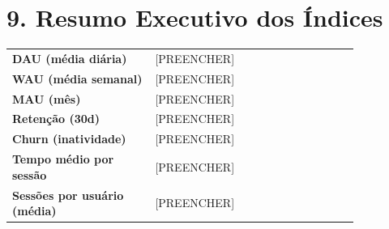 \documentclass[12pt]{article}
\providecommand{\DAUmedio}{[PREENCHER]}
\providecommand{\WAUMedio}{[PREENCHER]}
\providecommand{\MAU}{[PREENCHER]}
\providecommand{\RetencaoTaxa}{[PREENCHER]}
\providecommand{\ChurnTaxa}{[PREENCHER]}
\providecommand{\TempoMedioHM}{[PREENCHER]}
\providecommand{\SessoesPorUsuario}{[PREENCHER]}
\begin{document}
\section*{9. Resumo Executivo dos Índices}
\begin{center}
\begin{tabular}{>{\bfseries}p{0.35\linewidth} p{0.5\linewidth}}
\toprule
DAU (média diária) & \DAUmedio \\
WAU (média semanal) & \WAUMedio \\
MAU (mês) & \MAU \\
Retenção (30d) & \RetencaoTaxa \\
Churn (inatividade) & \ChurnTaxa \\
Tempo médio por sessão & \TempoMedioHM \\
Sessões por usuário (média) & \SessoesPorUsuario \\
\bottomrule
\end{tabular}
\end{center}
\end{document}
